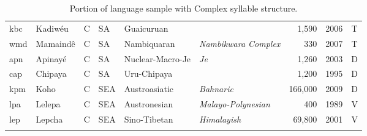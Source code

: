 \begin{table}
\begin{tabularx}{\textwidth}{lQllQQrlc}
 kbc & {{Kadiwéu}} & C & SA & {Guaicuruan} &  &  1,590 & 2006 & T\\
 wmd & {{Mamaindê}} & C & SA & {Nambiquaran} & {\textit{Nambikwara Complex}} &  330 & 2007 & T\\
 apn & {{Apinayé}} & C & SA & {Nuclear-Macro-Je} & {\textit{Je}} &  1,260 & 2003 & D\\
 cap & {{Chipaya}} & C & SA & {Uru-Chipaya} &  &  1,200 & 1995 & D\\
 kpm & {{Koho}} & C & SEA  & {Austroasiatic} & {\textit{Bahnaric}} &  166,000 & 2009 & D\\
 lpa & {{Lelepa}} & C & SEA  & {Austronesian} & {\textit{Malayo-Polynesian}} &  400 & 1989 & V\\
 lep & {{Lepcha}} & C & SEA  & {Sino-Tibetan} & {\textit{Himalayish}} &  69,800 & 2001 & V\\
\lspbottomrule
\end{tabularx}
\caption{Portion of language sample with Complex syllable structure.\label{tab:A.3}}
\end{table}


